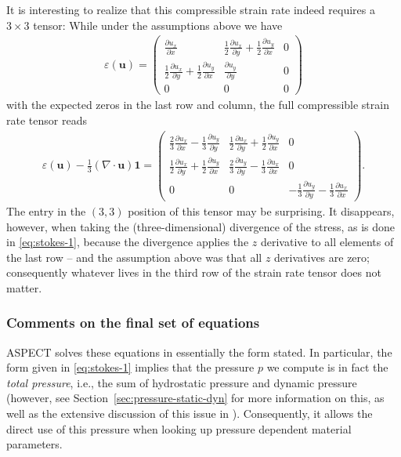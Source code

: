 \documentclass{article}
\newcommand{\aspect}{\textsc{ASPECT}}
\begin{document}
It is interesting to realize that this compressible strain rate indeed requires
a $3\times 3$ tensor: While under the assumptions above we have
\begin{align*}
  \varepsilon(\mathbf u) =
  \begin{pmatrix}
    \tfrac{\partial u_x}{\partial x}
    &
    \tfrac 12 \tfrac{\partial u_x}{\partial y} +
    \tfrac 12 \tfrac{\partial u_y}{\partial x}
    &
    0
    \\
    \tfrac 12 \tfrac{\partial u_x}{\partial y} +
    \tfrac 12 \tfrac{\partial u_y}{\partial x}
    &
    \tfrac{\partial u_y}{\partial y}
    &
    0
    \\
    0 & 0 & 0
  \end{pmatrix}
\end{align*}
with the expected zeros in the last row and column, the full compressible strain
rate tensor reads
\begin{align*}
  \varepsilon(\mathbf u) - \frac{1}{3}(\nabla \cdot \mathbf u)\mathbf 1 =
  \begin{pmatrix}
    \tfrac 23 \tfrac{\partial u_x}{\partial x}
    - \tfrac 13 \tfrac{\partial u_y}{\partial y}
    &
    \tfrac 12 \tfrac{\partial u_x}{\partial y} +
    \tfrac 12 \tfrac{\partial u_y}{\partial x}
    &
    0
    \\
    \tfrac 12 \tfrac{\partial u_x}{\partial y} +
    \tfrac 12 \tfrac{\partial u_y}{\partial x}
    &
    \tfrac 23 \tfrac{\partial u_y}{\partial y}
    - \tfrac 13 \tfrac{\partial u_x}{\partial x}
    &
    0
    \\
    0 & 0 &
    - \tfrac 13 \tfrac{\partial u_y}{\partial y}
    - \tfrac 13 \tfrac{\partial u_x}{\partial x}
  \end{pmatrix}.
\end{align*}
The entry in the $(3,3)$ position of this tensor may be surprising. It
disappears, however, when taking the (three-dimensional) divergence of the
stress, as is done in \eqref{eq:stokes-1}, because the divergence applies the $z$ derivative to all
elements of the last row -- and the assumption above was that all $z$
derivatives are zero; consequently whatever lives in the third row of the
strain rate tensor does not matter.



\subsubsection{Comments on the final set of equations}
\aspect{} solves these equations in essentially the form stated. In
particular, the form given in \eqref{eq:stokes-1} implies that the pressure
$p$ we compute is in fact the \textit{total pressure}, i.e., the sum of
hydrostatic pressure and dynamic pressure (however, see
Section~\ref{sec:pressure-static-dyn} for more information on this, as well as
the extensive discussion of this issue in \cite{KHB12}).
Consequently, it allows the direct use of this pressure when looking up
pressure dependent material parameters.
\end{document}
